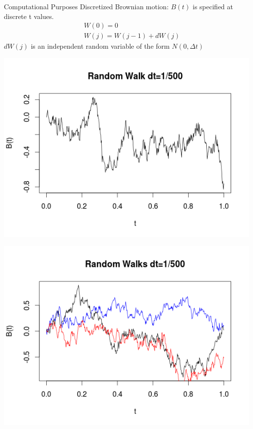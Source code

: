 \begin{frame}{Computational Purposes}
\pause
Discretized Brownian motion: $B(t)$ is specified at discrete t values.
\begin{eqnarray*}
&& W(0)=0\\
&& W(j)=W(j-1)+dW(j)
\end{eqnarray*}
$dW(j)$ is an independent random variable of the form $N(0,\Delta t)$
\end{frame}

\begin{frame}
\begin{center}
\includegraphics[scale=0.5]{r_w_3.png}
\end{center}
\end{frame}

\begin{frame}
\begin{center}
\includegraphics[scale=0.5]{r_w_4.png}
\end{center}
\end{frame}

